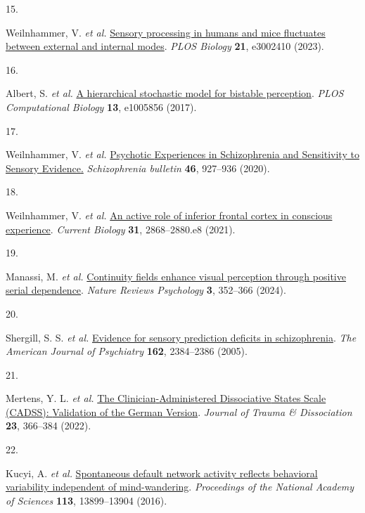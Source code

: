 \documentclass[
]{article}
\newlength{\cslhangindent}
\newlength{\csllabelwidth}
\newenvironment{CSLReferences}[2] %
 {\begin{list}{}{%
  \setlength{\itemindent}{0pt}
  \setlength{\leftmargin}{0pt}
  \setlength{\parsep}{0pt}
  \ifodd #1
   \setlength{\leftmargin}{\cslhangindent}
   \setlength{\itemindent}{-1\cslhangindent}
  \fi
  \setlength{\itemsep}{#2\baselineskip}}}
 {\end{list}}
\newcommand{\CSLLeftMargin}[1]{\parbox[t]{\csllabelwidth}{\strut#1\strut}}
\newcommand{\CSLRightInline}[1]{\parbox[t]{\linewidth - \csllabelwidth}{\strut#1\strut}}
\begin{document}
\begin{CSLReferences}{0}{0}
\CSLLeftMargin{15. }%
\CSLRightInline{Weilnhammer, V. \emph{et al.}
\href{https://doi.org/10.1371/journal.pbio.3002410}{Sensory processing
in humans and mice fluctuates between external and internal modes}.
\emph{PLOS Biology} \textbf{21}, e3002410 (2023).}

\CSLLeftMargin{16. }%
\CSLRightInline{Albert, S. \emph{et al.}
\href{https://doi.org/10.1371/journal.pcbi.1005856}{A hierarchical
stochastic model for bistable perception}. \emph{PLOS Computational
Biology} \textbf{13}, e1005856 (2017).}

\CSLLeftMargin{17. }%
\CSLRightInline{Weilnhammer, V. \emph{et al.}
\href{http://www.ncbi.nlm.nih.gov/pubmed/32090246}{Psychotic
{Experiences} in {Schizophrenia} and {Sensitivity} to {Sensory}
{Evidence}.} \emph{Schizophrenia bulletin} \textbf{46}, 927--936
(2020).}

\CSLLeftMargin{18. }%
\CSLRightInline{Weilnhammer, V. \emph{et al.}
\href{https://doi.org/10.1016/j.cub.2021.04.043}{An active role of
inferior frontal cortex in conscious experience}. \emph{Current Biology}
\textbf{31}, 2868--2880.e8 (2021).}

\CSLLeftMargin{19. }%
\CSLRightInline{Manassi, M. \emph{et al.}
\href{https://doi.org/10.1038/s44159-024-00297-x}{Continuity fields
enhance visual perception through positive serial dependence}.
\emph{Nature Reviews Psychology} \textbf{3}, 352--366 (2024).}

\CSLLeftMargin{20. }%
\CSLRightInline{Shergill, S. S. \emph{et al.}
\href{https://doi.org/10.1176/appi.ajp.162.12.2384}{Evidence for sensory
prediction deficits in schizophrenia}. \emph{The American Journal of
Psychiatry} \textbf{162}, 2384--2386 (2005).}

\CSLLeftMargin{21. }%
\CSLRightInline{Mertens, Y. L. \emph{et al.}
\href{https://doi.org/10.1080/15299732.2021.1989111}{The
{Clinician}-{Administered} {Dissociative} {States} {Scale} ({CADSS}):
{Validation} of the {German} {Version}}. \emph{Journal of Trauma \&
Dissociation} \textbf{23}, 366--384 (2022).}

\CSLLeftMargin{22. }%
\CSLRightInline{Kucyi, A. \emph{et al.}
\href{https://doi.org/10.1073/pnas.1611743113}{Spontaneous default
network activity reflects behavioral variability independent of
mind-wandering}. \emph{Proceedings of the National Academy of Sciences}
\textbf{113}, 13899--13904 (2016).}


\end{CSLReferences}
\end{document}

